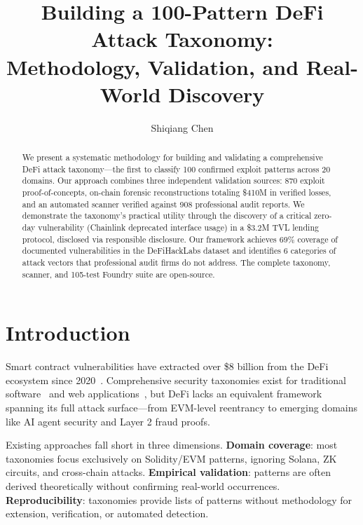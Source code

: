 \documentclass[runningheads]{llncs}
\begin{document}
\title{Building a 100-Pattern DeFi Attack Taxonomy: \\ Methodology, Validation, and Real-World Discovery}
\author{Shiqiang Chen}
\maketitle

\begin{abstract}
We present a systematic methodology for building and validating a comprehensive DeFi attack taxonomy—the first to classify 100 confirmed exploit patterns across 20 domains. Our approach combines three independent validation sources: 870 exploit proof-of-concepts, on-chain forensic reconstructions totaling \$410M in verified losses, and an automated scanner verified against 908 professional audit reports. We demonstrate the taxonomy's practical utility through the discovery of a critical zero-day vulnerability (Chainlink deprecated interface usage) in a \$3.2M TVL lending protocol, disclosed via responsible disclosure. Our framework achieves 69\% coverage of documented vulnerabilities in the DeFiHackLabs dataset and identifies 6 categories of attack vectors that professional audit firms do not address. The complete taxonomy, scanner, and 105-test Foundry suite are open-source.
\end{abstract}

\section{Introduction}

Smart contract vulnerabilities have extracted over \$8 billion from the DeFi ecosystem since 2020~\cite{defillama}. Comprehensive security taxonomies exist for traditional software~\cite{cwe} and web applications~\cite{owasp}, but DeFi lacks an equivalent framework spanning its full attack surface—from EVM-level reentrancy to emerging domains like AI agent security and Layer 2 fraud proofs.

Existing approaches fall short in three dimensions. \textbf{Domain coverage}: most taxonomies focus exclusively on Solidity/EVM patterns, ignoring Solana, ZK circuits, and cross-chain attacks. \textbf{Empirical validation}: patterns are often derived theoretically without confirming real-world occurrences. \textbf{Reproducibility}: taxonomies provide lists of patterns without methodology for extension, verification, or automated detection.
\end{document}
